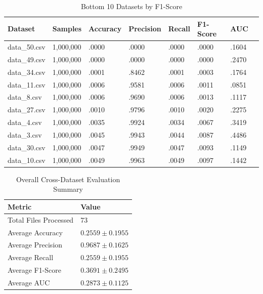 \documentclass[pdflatex,sn-mathphys-num]{sn-jnl}
\theoremstyle{thmstyleone}%
\theoremstyle{thmstyletwo}%
\theoremstyle{thmstylethree}%
\begin{document}
\begin{table}[htbp]
\centering
\small
\caption{Bottom 10 Datasets by F1-Score}
\label{Bottom10DatasetsByF1}

\renewcommand{\arraystretch}{1.0}
\setlength{\tabcolsep}{4pt}
\begin{tabular}{@{}p{1.8cm}p{1.6cm}p{1.4cm}p{1.2cm}p{1.1cm}p{1.3cm}p{1.3cm}p{1.2cm}@{}}\toprule
\textbf{Dataset} 
& \textbf{Samples}
& \textbf{Accuracy}
& \textbf{Precision}
& \textbf{Recall}
& \textbf{F1-Score}
& \textbf{AUC} \\
\midrule

data\_50.csv & 1,000,000 & .0000 & .0000 & .0000 & .0000 & .1604 \\
data\_49.csv & 1,000,000 & .0000 & .0000 & .0000 & .0000 & .2470 \\
data\_34.csv & 1,000,000 & .0001 & .8462 & .0001 & .0003 & .1764 \\
data\_11.csv & 1,000,000 & .0006 & .9581 & .0006 & .0011 & .0851 \\
data\_8.csv  & 1,000,000 & .0006 & .9690 & .0006 & .0013 & .1117 \\
data\_27.csv & 1,000,000 & .0010 & .9796 & .0010 & .0020 & .2275 \\
data\_4.csv  & 1,000,000 & .0035 & .9924 & .0034 & .0067 & .3419 \\
data\_3.csv  & 1,000,000 & .0045 & .9943 & .0044 & .0087 & .4486 \\
data\_30.csv & 1,000,000 & .0047 & .9949 & .0047 & .0093 & .1149 \\
data\_10.csv & 1,000,000 & .0049 & .9963 & .0049 & .0097 & .1442 \\


\bottomrule
\end{tabular}
\end{table}

\begin{table}[htbp]
\centering
\small
\caption{Overall Cross-Dataset Evaluation Summary}
\label{OverallEvaluationSummary}

\renewcommand{\arraystretch}{1.0}
\setlength{\tabcolsep}{6pt}
\begin{tabular}{@{}p{5.5cm}p{3.5cm}@{}}
\toprule
\textbf{Metric} & \textbf{Value} \\
\midrule

Total Files Processed     & 73 \\
\midrule

Average Accuracy   & $0.2559 \pm 0.1955$ \\
Average Precision  & $0.9687 \pm 0.1625$ \\
Average Recall     & $0.2559 \pm 0.1955$ \\
Average F1-Score   & $0.3691 \pm 0.2495$ \\
Average AUC        & $0.2873 \pm 0.1125$ \\

\bottomrule
\end{tabular}
\end{table}
\end{document}
